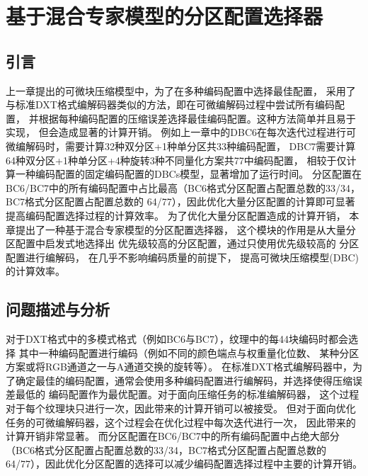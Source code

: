 
\chapter{基于混合专家模型的分区配置选择器}

\section{引言}

上一章提出的可微块压缩模型中，为了在多种编码配置中选择最佳配置，
采用了与标准DXT格式编解码器类似的方法，即在可微编解码过程中尝试所有编码配置，
并根据每种编码配置的压缩误差选择最佳编码配置。这种方法简单并且易于实现，
但会造成显著的计算开销。
例如上一章中的DBC6在每次迭代过程进行可微编解码时，需要计算32种双分区+1种单分区共33种编码配置，
DBC7需要计算64种双分区+1种单分区+4种旋转\times3种不同量化方案共77中编码配置，
相较于仅计算一种编码配置的固定编码配置的DBCs模型，显著增加了运行时间。
分区配置在BC6/BC7中的所有编码配置中占比最高（BC6格式分区配置占配置总数的33/34，BC7格式分区配置占配置总数的
64/77），因此优化大量分区配置的计算即可显著提高编码配置选择过程的计算效率。
为了优化大量分区配置造成的计算开销，
本章提出了一种基于混合专家模型的分区配置选择器，
这个模块的作用是从大量分区配置中启发式地选择出
优先级较高的分区配置，通过只使用优先级较高的
分区配置进行编解码，
在几乎不影响编码质量的前提下，
提高可微块压缩模型(DBC)的计算效率。

\section{问题描述与分析}

对于DXT格式中的多模式格式（例如BC6与BC7），纹理中的每4\times4块编码时都会选择
其中一种编码配置进行编码（例如不同的颜色端点与权重量化位数、
某种分区方案或将RGB通道之一与A通道交换的旋转等）。
在标准DXT格式编解码器中，为了确定最佳的编码配置，通常会使用多种编码配置进行编解码，并选择使得压缩误差最低的
编码配置作为最优配置。对于面向压缩任务的标准编解码器，
这个过程对于每个纹理块只进行一次，因此带来的计算开销可以被接受。
但对于面向优化任务的可微编解码器，这个过程会在优化过程中每次迭代进行一次，
因此带来的计算开销非常显著。
而分区配置在BC6/BC7中的所有编码配置中占绝大部分（BC6格式分区配置占配置总数的33/34，BC7格式分区配置占配置总数的
64/77），因此优化分区配置的选择可以减少编码配置选择过程中主要的计算开销。

